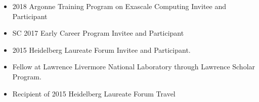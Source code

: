 \begin{itemize} 
\item 2018 Argonne Training Program on Exascale Computing Invitee and Participant
\item SC 2017 Early Career Program Invitee and Participant
\item 2015 Heidelberg Laureate Forum Invitee and Participant.
\item Fellow at Lawrence Livermore National Laboratory through Lawrence Scholar Program.
\item \small Recipient of 2015 Heidelberg Laureate Forum Travel
\end{itemize}
